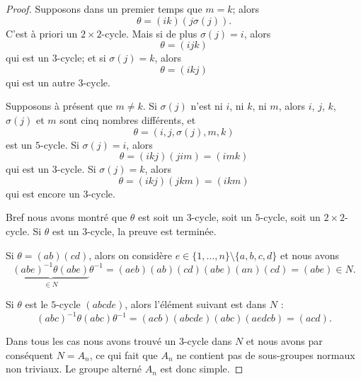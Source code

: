 \begin{proof}
    Supposons dans un premier temps que \( m=k\); alors
    \begin{equation}
        \theta=(ik)(j\sigma(j)).
    \end{equation}
    C'est à priori un \( 2\times 2\)-cycle. Mais si de plus \( \sigma(j) = i \), alors
    \begin{equation}
        \theta=(ijk)
    \end{equation}
    qui est un \( 3\)-cycle; et si \( \sigma(j) = k \), alors
    \begin{equation}
        \theta=(ikj)
    \end{equation}
    qui est un autre \( 3\)-cycle.

    Supposons à présent que \( m \neq k \). Si \( \sigma(j) \) n'est ni $i$, ni $k$, ni $m$, alors \( i\), \( j\), \( k\), \( \sigma(j)\) et \( m\) sont cinq nombres différents, et
    \begin{equation}
        \theta=(i,j,\sigma(j),m,k)
    \end{equation}
    est un \( 5\)-cycle. Si \( \sigma(j) = i\), alors
    \begin{equation}
        \theta=(ikj)(jim) = (imk)
    \end{equation}
    qui est un \( 3\)-cycle. Si \( \sigma(j)=k\), alors
    \begin{equation}
        \theta=(ikj)(jkm) = (ikm)
    \end{equation}
    qui est encore un \( 3\)-cycle.

    Bref nous avons montré que \( \theta\) est soit un \( 3\)-cycle, soit un \( 5\)-cycle, soit un \( 2\times 2\)-cycle. Si \( \theta\) est un \( 3\)-cycle, la preuve est terminée.

    Si \( \theta=(ab)(cd)\), alors on considère \( e\in \{ 1,\ldots, n \}\setminus\{ a,b,c,d \}\) et nous avons
    \begin{equation}
        \underbrace{(abe)^{-1}\theta(abe)}_{\in N}\theta^{-1}=(aeb)(ab)(cd)(abe)(an)(cd)=(abe)\in N.
    \end{equation}

    Si \( \theta\) est le \( 5\)-cycle \( (abcde)\), alors l'élément suivant est dans \( N\) :
    \begin{equation}
        (abc)^{-1}\theta(abc)\theta^{-1}=(acb)(abcde)(abc)(aedcb)=(acd).
    \end{equation}

    Dans tous les cas nous avons trouvé un \( 3\)-cycle dans \( N\) et nous avons par conséquent \( N=A_n\), ce qui fait que \( A_n\) ne contient pas de sous-groupes normaux non triviaux. Le groupe alterné \( A_n\) est donc simple.
\end{proof}

